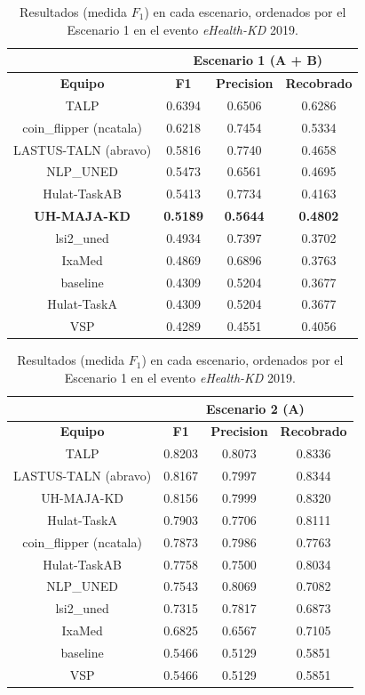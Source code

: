 \begin{table}[tb!]\centering
	\caption{Resultados (medida $F_1$) en cada escenario, ordenados por el Escenario 1 en el evento \textit{eHealth-KD} 2019. \label{table:results_19}}
	\begin{tabular}{|c|c|c|c|}
		\hline
		&  \multicolumn{3}{c|}{\textbf{Escenario 1 (A + B)}} \\
		\hline
		\textbf{Equipo} & \textbf{F1} & \textbf{Precision} & \textbf{Recobrado} \\
		\hline
		TALP	          	   &  0.6394 &  0.6506 &  0.6286 \\
		coin\_flipper (ncatala) & 0.6218 &  0.7454 &  0.5334 \\	
		LASTUS-TALN (abravo)   & 0.5816 &  0.7740 &  0.4658	\\
		NLP\_UNED               & 0.5473 & 0.6561 &  0.4695 \\
		Hulat-TaskAB           & 0.5413 &  0.7734 &  0.4163 \\	
		\textbf{UH-MAJA-KD}    & \textbf{0.5189} &  \textbf{0.5644} &  \textbf{0.4802} \\	
		lsi2\_uned              & 0.4934 &  0.7397 & 0.3702	\\
		IxaMed                 & 0.4869 &  0.6896 &  0.3763 \\
		baseline               & 0.4309 &  0.5204 &  0.3677 \\
		Hulat-TaskA            & 0.4309 &  0.5204 &  0.3677 \\	
		VSP             	   & 0.4289 &  0.4551 &  0.4056 \\	
		\hline
	\end{tabular}
\end{table}

\begin{table}[tb!]\centering
	\caption{Resultados (medida $F_1$) en cada escenario, ordenados por el Escenario 1 en el evento \textit{eHealth-KD} 2019. \label{table:results_19}}
	\begin{tabular}{|c|c|c|c|}
		\hline
		&  \multicolumn{3}{c|}{\textbf{Escenario 2 (A) }} \\
		\hline
		\textbf{Equipo} & \textbf{F1} & \textbf{Precision} & \textbf{Recobrado} \\
		\hline
		TALP	& 0.8203 & 0.8073 & 0.8336	\\
		LASTUS-TALN (abravo) & 0.8167 & 0.7997 & 0.8344	 \\
		UH-MAJA-KD & 0.8156 & 0.7999 & 0.8320	\\
		Hulat-TaskA & 0.7903 & 0.7706 & 0.8111	\\
		coin\_flipper (ncatala) & 0.7873 & 0.7986 & 0.7763	\\
		Hulat-TaskAB & 0.7758 & 0.7500 & 0.8034	 \\
		NLP\_UNED & 0.7543 & 0.8069 & 0.7082	\\
		lsi2\_uned & 0.7315 & 0.7817 & 0.6873 \\	 
		IxaMed & 0.6825 & 0.6567 & 0.7105	 \\
		baseline & 0.5466 & 0.5129 & 0.5851	\\
		VSP & 0.5466 & 0.5129 & 0.5851	\\
		\hline
	\end{tabular}
\end{table}


